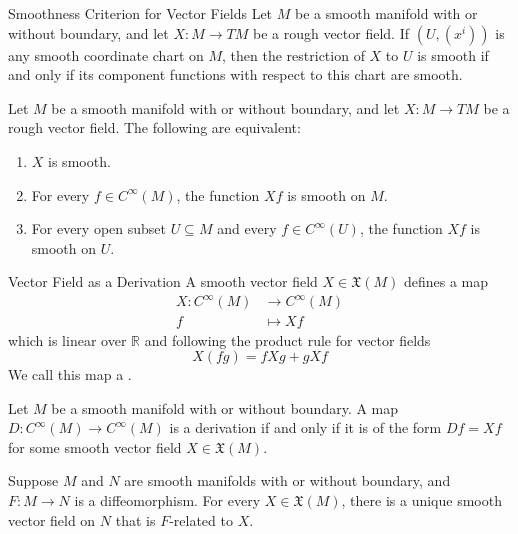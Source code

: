 \documentclass[../main.tex]{subfiles}
\begin{document}
\begin{proposition}{Smoothness Criterion for Vector Fields}{}
Let $M$ be a smooth manifold with or without boundary, and let $X: M \to TM$ be a rough vector field. If $(U, (x^i))$ is any smooth coordinate chart on $M$, then the restriction of $X$ to $U$ is smooth if and only if its component functions with respect to this chart are smooth.
\end{proposition}

\begin{proposition}{}{}
Let $M$ be a smooth manifold with or without boundary, and let $X : M \to TM$ be a rough vector field. The following are equivalent:
\begin{enumerate}
\item[(a)] $X$ is smooth.
\item[(b)] For every $f \in C^\infty(M)$, the function $Xf$ is smooth on $M$.
\item[(c)] For every open subset $U \subseteq M$ and every $f \in C^\infty(U)$, the function $Xf$ is smooth on $U$.
\end{enumerate}
\end{proposition}
\begin{definition}{Vector Field as a Derivation}{}
    A smooth vector field \(  X \in \mathfrak{X}\left( M \right)   \) defines a map  \[
    \begin{aligned}
    X:C^{\infty}\left( M \right) & \to C^{\infty}\left( M \right)\\ 
     f & \mapsto  Xf   
    \end{aligned}
    \] which is linear over \(  \mathbb{R}   \) and following the product rule for vector fields \[
    X\left( fg \right)= f Xg+ gXf 
    \] We call this map a .    
\end{definition}

\begin{proposition}{}{}
Let $M$ be a smooth manifold with or without boundary. A map $D: C^{\infty}(M) \to C^{\infty}(M)$ is a derivation if and only if it is of the form $Df = Xf$ for some smooth vector field $X \in \mathfrak{X}(M)$.
\end{proposition}

\begin{proposition}{}{}
Suppose \(M\) and \(N\) are smooth manifolds with or without boundary, and \(F:M\to N\) is a diffeomorphism. For every \(X\in\mathfrak{X}(M)\), there is a unique smooth vector field on \(N\) that is \(F\)-related to \(X\).
\end{proposition}
\end{document}
